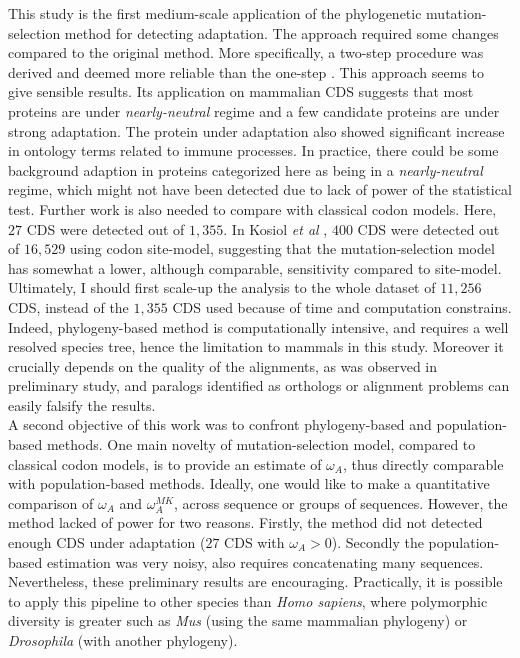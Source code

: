 This study is the first medium-scale application of the phylogenetic mutation-selection method for detecting adaptation. The approach required some changes compared to the original method. More specifically, a two-step procedure was derived and deemed more reliable than the one-step \cite{lartillot_phylobayes_2013}. This approach seems to give sensible results. Its application on mammalian CDS suggests that most proteins are under \textit{nearly-neutral} regime and a few candidate proteins are under strong adaptation. The protein under adaptation also showed significant increase in ontology terms related to immune processes. In practice, there could be some background adaption in proteins categorized here as being in a \textit{nearly-neutral} regime, which might not have been detected due to lack of power of the statistical test. Further work is also needed to compare with classical codon models. Here, $27$ CDS were detected out of $1,355$. In Kosiol \textit{et al} \cite{kosiol_patterns_2008}, $400$ CDS were detected out of $16,529$ using codon site-model, suggesting that the mutation-selection model has somewhat a lower, although comparable, sensitivity compared to site-model. Ultimately, I should first scale-up the analysis to the whole dataset of $11,256$ CDS, instead of the $1,355$ CDS used because of time and computation constrains. Indeed, phylogeny-based method is computationally intensive, and requires a well resolved species tree, hence the limitation to mammals in this study. Moreover it crucially depends on the quality of the alignments, as was observed in preliminary study, and paralogs identified as orthologs or alignment problems can easily falsify the results.\\

A second objective of this work was to confront phylogeny-based and population-based methods. One main novelty of mutation-selection model, compared to classical codon models, is to provide an estimate of $\omega_A$, thus directly comparable with population-based methods. Ideally, one would like to make a quantitative comparison of $\omega_A$ and $\omega_A^{MK}$, across sequence or groups of sequences. However, the method lacked of power for two reasons. Firstly, the method did not detected enough CDS under adaptation ($27$ CDS with $\omega_A > 0$). Secondly the population-based estimation was very noisy, also requires concatenating many sequences. Nevertheless, these preliminary results are encouraging. Practically, it is possible to apply this pipeline to other species than \textit{Homo sapiens}, where polymorphic diversity is greater such as \textit{Mus} (using the same mammalian phylogeny) or \textit{Drosophila} (with another phylogeny). \\

